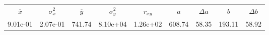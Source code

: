 \begin{tabular}{ccccccccc}
\toprule
$\overline{x}$ & $\sigma_x^2$ & $\overline{y}$ & $\sigma_y^2$ & $r_{xy}$ & $a$ & $\Delta a$ & $b$ & $\Delta b$ \\
\midrule
9.01e-01 & 2.07e-01 & 741.74 & 8.10e+04 & 1.26e+02 & 608.74 & 58.35 & 193.11 & 58.92 \\
\bottomrule
\end{tabular}
